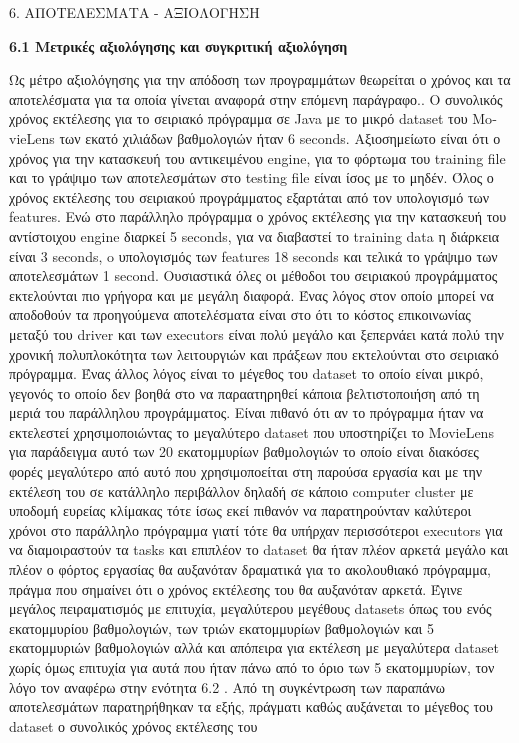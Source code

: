 \documentclass{report}
\begin{document}
{\begin{center}
\LARGE{6. ΑΠΟΤΕΛΕΣΜΑΤΑ - ΑΞΙΟΛΟΓΗΣΗ}
\end{center}

\vspace{5mm} 

\textbf{\large{6.1 Μετρικές αξιολόγησης και συγκριτική αξιολόγηση}}


    Ως μέτρο αξιολόγησης για την απόδοση των προγραμμάτων θεωρείται ο χρόνος και τα αποτελέσματα για τα οποία γίνεται αναφορά στην επόμενη παράγραφο.. Ο συνολικός χρόνος εκτέλεσης για το σειριακό πρόγραμμα σε \textlatin{Java} με το μικρό \textlatin{dataset} του \textlatin{MovieLens} των εκατό χιλιάδων βαθμολογιών ήταν 6 \textlatin{seconds}. Αξιοσημείωτο είναι ότι ο χρόνος για την κατασκευή του αντικειμένου engine, για το φόρτωμα του \textlatin{training file} και το γράψιμο των αποτελεσμάτων στο \textlatin{testing file} είναι ίσος με το μηδέν. Όλος ο χρόνος εκτέλεσης του σειριακού προγράμματος εξαρτάται από τον υπολογισμό των \textlatin{features}. Ενώ στο παράλληλο πρόγραμμα ο χρόνος εκτέλεσης  για την κατασκευή του αντίστοιχου \textlatin{engine}  διαρκεί 5 \textlatin{seconds}, για να διαβαστεί το \textlatin{training data } η διάρκεια είναι 3 \textlatin{seconds}, o υπολογισμός των \textlatin{features} 18 \textlatin{seconds} και τελικά το γράψιμο των αποτελεσμάτων 1 \textlatin{second}. Ουσιαστικά όλες οι μέθοδοι του σειριακού προγράμματος εκτελούνται πιο γρήγορα και με μεγάλη διαφορά. Ένας  λόγος στον οποίο μπορεί να αποδοθούν τα προηγούμενα αποτελέσματα είναι στο ότι το κόστος επικοινωνίας μεταξύ του \textlatin{driver} και των \textlatin{executors} είναι πολύ μεγάλο και ξεπερνάει κατά πολύ την χρονική πολυπλοκότητα των λειτουργιών και πράξεων που εκτελούνται στο σειριακό πρόγραμμα. Ένας άλλος λόγος είναι το μέγεθος του \textlatin{dataset} το οποίο είναι μικρό, γεγονός το οποίο δεν βοηθά στο να παραατηρηθεί κάποια βελτιστοποιήση από τη μεριά του παράλληλου προγράμματος. Είναι πιθανό ότι αν το πρόγραμμα ήταν να εκτελεστεί χρησιμοποιώντας το μεγαλύτερο \textlatin{dataset} που υποστηρίζει το \textlatin{MovieLens} για παράδειγμα αυτό των 20 εκατομμυρίων βαθμολογιών  το οποίο είναι διακόσες φορές μεγαλύτερο από αυτό που χρησιμοποείται στη παρούσα εργασία και με την εκτέλεση του σε κατάλληλο περιβάλλον δηλαδή σε κάποιο \textlatin{computer cluster} με υποδομή ευρείας κλίμακας τότε ίσως εκεί πιθανόν να παρατηρούνταν καλύτεροι χρόνοι στο παράλληλο πρόγραμμα γιατί τότε θα υπήρχαν περισσότεροι \textlatin{executors} για να διαμοιραστούν τα \textlatin{tasks} και επιπλέον το \textlatin{dataset} θα ήταν πλέον αρκετά μεγάλο και πλέον ο φόρτος εργασίας θα αυξανόταν δραματικά για το ακολουθιακό πρόγραμμα, πράγμα που σημαίνει ότι ο χρόνος εκτέλεσης του θα αυξανόταν αρκετά. Έγινε μεγάλος πειραματισμός με επιτυχία, μεγαλύτερου μεγέθους \textlatin{datasets}  όπως του ενός εκατομμυρίου βαθμολογιών, των τριών εκατομμυρίων βαθμολογιών και 5 εκατομμυριών βαθμολογιών αλλά και απόπειρα για εκτέλεση με μεγαλύτερα \textlatin{dataset} χωρίς όμως επιτυχία για αυτά που ήταν πάνω από το όριο των 5 εκατομμυρίων, τον λόγο τον αναφέρω στην ενότητα 6.2 . Από τη συγκέντρωση των παραπάνω αποτελεσμάτων παρατηρήθηκαν τα εξής, πράγματι καθώς αυξάνεται το μέγεθος του \textlatin{dataset} ο συνολικός χρόνος εκτέλεσης του }
\end{document}
